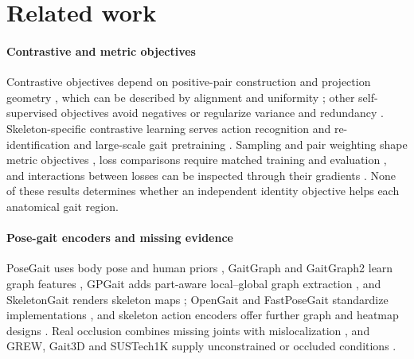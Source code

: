 \documentclass[review,12pt]{elsarticle}
\begin{document}
\section{Related work}
\label{sec:related}

\paragraph{Contrastive and metric objectives}
Contrastive objectives depend on positive-pair construction and projection
geometry \cite{chen2020simclr,he2020moco,khosla2020supervised}, which can be
described by alignment and uniformity \cite{wang2020alignment}; other
self-supervised objectives avoid negatives or regularize variance and
redundancy \cite{grill2020byol,chen2021simsiam,zbontar2021barlow,bardes2022vicreg}.
Skeleton-specific contrastive learning serves action recognition and
re-identification \cite{thoker2021skeleton,rao2024skeleton,lin2023actclr} and
large-scale gait pretraining \cite{cosma2026gaitpt}. Sampling and pair weighting
shape metric objectives \cite{wu2017sampling,wang2019multisimilarity}, loss
comparisons require matched training and evaluation \cite{musgrave2020reality},
and interactions between losses can be inspected through their gradients
\cite{sener2018multiobjective,yu2020gradient}. None of these results determines
whether an independent identity objective helps each anatomical gait region.

\paragraph{Pose-gait encoders and missing evidence}
PoseGait uses body pose and human priors \cite{liao2020posegait}, GaitGraph
and GaitGraph2 learn graph features \cite{teepe2021gaitgraph,teepe2022gaitgraph2},
GPGait adds part-aware local--global graph extraction \cite{fu2023gpgait}, and
SkeletonGait renders skeleton maps \cite{fan2024skeletongait}; OpenGait and
FastPoseGait standardize implementations \cite{fan2022opengait,meng2023fastposegait},
and skeleton action encoders offer further graph and heatmap designs
\cite{shi2019adaptive,li2019actional,liu2020msg3d,cheng2020shift,duan2022posec3d}.
Real occlusion combines missing joints with mislocalization
\cite{li2024survey,huang2024occluded,chen2023iopstl}, and GREW, Gait3D and
SUSTech1K supply unconstrained or occluded conditions
\cite{zhu2021grew,zheng2022gait3d,shen2023lidargait}.
\end{document}
